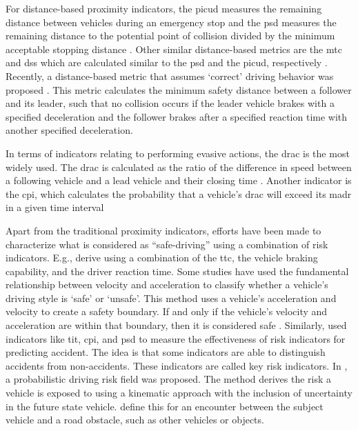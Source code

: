 For distance-based proximity indicators, the \ac{picud} measures the remaining distance between vehicles during an emergency stop \autocite{iida2001traffic, uno2003objective} and the \ac{psd} measures the remaining distance to the potential point of collision divided by the minimum acceptable stopping distance \autocite{allen1978analysis, guido2011comparing, mahmud2017application}. 
Other similar distance-based metrics are the \ac{mtc} and \ac{dss} which are calculated similar to the \ac{psd} and the \ac{picud}, respectively \autocite{kitajima2009estimation, okamura2011impact}. 
Recently, a distance-based metric that assumes `correct' driving behavior was proposed \autocite{shalev2017formal}. 
This metric calculates the minimum safety distance between a follower and its leader, such that no collision occurs if the leader vehicle brakes with a specified deceleration and the follower brakes after a specified reaction time with another specified deceleration. 

In terms of indicators relating to performing evasive actions, the \ac{drac} is the most widely used. 
The \ac{drac} is calculated as the ratio of the difference in speed between a following vehicle and a lead vehicle and their closing time \autocite{almqvist1991use, mahmud2017application}. 
Another indicator is the \ac{cpi}, which calculates the probability that a vehicle's \ac{drac} will exceed its \ac{madr} in a given time interval \autocite{cunto2009simulated} 


Apart from the traditional proximity indicators, efforts have been made to characterize what is considered as ``safe-driving'' using a combination of risk indicators.
E.g., \textcite{wang2014evaluation} derive  using a combination of the \ac{ttc}, the vehicle braking capability, and the driver reaction time.
Some studies have used the fundamental relationship between velocity and acceleration to classify whether a vehicle’s driving style  is `safe' or `unsafe'. 
This method uses a vehicle's acceleration and velocity to create a safety boundary.
If and only if the vehicle's velocity and acceleration are within that boundary, then it is considered safe  \autocite{eboli2016combining}.
Similarly, \textcite{shi2018key} used indicators like \ac{tit}, \ac{cpi}, and \ac{psd} to measure the effectiveness of risk indicators for predicting accident. 
The idea is that some indicators are able to distinguish accidents from non-accidents. 
These indicators are called key risk indicators. 
In \autocite{mullakkal2020modelling}, a probabilistic driving risk field was proposed.
The method derives the risk a vehicle is exposed to using a kinematic approach with the inclusion of uncertainty in the future state vehicle. 
\textcite{mullakkal2020modelling} define this for an encounter between the subject vehicle and a road obstacle, such as other vehicles or objects. 
